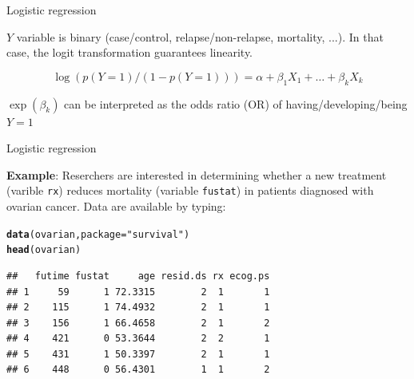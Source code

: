 \documentclass[10pt,xcolor=dvipsnames]{beamer}\usepackage[]{graphicx}\usepackage[]{color}
\makeatletter
\newcommand{\hlstr}[1]{\textcolor[rgb]{0.192,0.494,0.8}{#1}}%
\newcommand{\hlstd}[1]{\textcolor[rgb]{0.345,0.345,0.345}{#1}}%
\newcommand{\hlkwc}[1]{\textcolor[rgb]{0.333,0.667,0.333}{#1}}%
\newcommand{\hlkwd}[1]{\textcolor[rgb]{0.737,0.353,0.396}{\textbf{#1}}}%
\newenvironment{kframe}{%
 \def\at@end@of@kframe{}%
 \ifinner\ifhmode%
  \def\at@end@of@kframe{\end{minipage}}%
  \begin{minipage}{\columnwidth}%
 \fi\fi%
 \def\FrameCommand##1{\hskip\@totalleftmargin \hskip-\fboxsep
 \colorbox{shadecolor}{##1}\hskip-\fboxsep
     \hskip-\linewidth \hskip-\@totalleftmargin \hskip\columnwidth}%
 \MakeFramed {\advance\hsize-\width
   \@totalleftmargin\z@ \linewidth\hsize
   \@setminipage}}%
 {\par\unskip\endMakeFramed%
 \at@end@of@kframe}
\newenvironment{knitrout}{}{} %
\makeatother
\begin{document}
\begin{frame}[fragile]{Logistic regression}

$Y$ variable is binary (case/control, relapse/non-relapse, mortality, ...). In that case, the logit
transformation guarantees linearity.

$$ \log(p(Y=1)/(1-p(Y=1))) = \alpha + \beta_1 X_1 + \ldots + \beta_k X_k $$

$\exp(\beta_k)$ can be interpreted as the odds ratio (OR) of having/developing/being $Y=1$

\end{frame}


\begin{frame}[fragile]{Logistic regression}

\textbf{Example}: Reserchers are interested in determining whether a new treatment (varible {\tt rx})
reduces mortality (variable {\tt fustat}) in patients diagnosed with ovarian cancer. 
Data are available by typing:

\begin{knitrout}
\color{fgcolor}\begin{kframe}
\begin{alltt}
\hlkwd{data}\hlstd{(ovarian,} \hlkwc{package}\hlstd{=}\hlstr{"survival"}\hlstd{)}
\hlkwd{head}\hlstd{(ovarian)}
\end{alltt}
\begin{verbatim}
##   futime fustat     age resid.ds rx ecog.ps
## 1     59      1 72.3315        2  1       1
## 2    115      1 74.4932        2  1       1
## 3    156      1 66.4658        2  1       2
## 4    421      0 53.3644        2  2       1
## 5    431      1 50.3397        2  1       1
## 6    448      0 56.4301        1  1       2
\end{verbatim}
\end{kframe}
\end{knitrout}
\end{frame}
\end{document}
